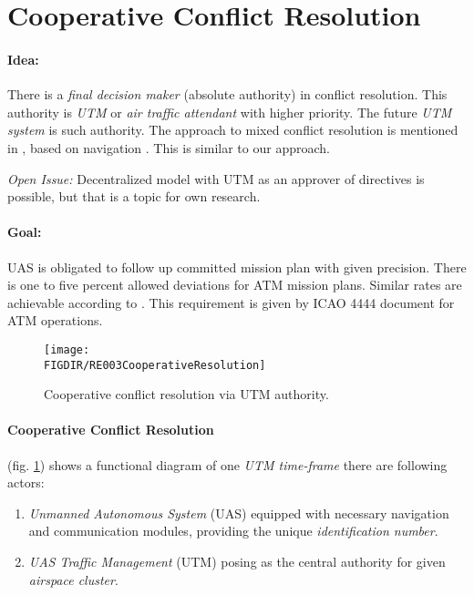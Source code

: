 \section{Cooperative Conflict Resolution}\label{sec:cooperativeConflictResolution}


\paragraph{Idea:} There is a \emph{final decision maker} (absolute authority) in conflict resolution. This authority is \emph{UTM} or \emph{air traffic attendant} with higher priority. The future \emph{UTM system} is such authority. The approach to mixed conflict resolution is mentioned in \cite{ramasamy2014towards}, based on navigation \cite{ramasamy2013novel}. This is similar to our approach. 

\begin{note}
    \emph{Open Issue:} Decentralized model with UTM as an approver of directives is possible, but that is a topic for own research.
\end{note}

\paragraph{Goal:} UAS is obligated to follow up committed mission plan with given precision.  There is one to five percent  allowed deviations for ATM mission plans.     Similar rates are achievable according to \cite{ramasamy2014towards}.  This requirement is given by \cite{icao4444} ICAO 4444 document for ATM operations.

\begin{figure}[H]
    \centering
    \texttt{[image: \\FIGDIR/RE003CooperativeResolution]} 
    \caption{Cooperative conflict resolution via UTM authority.}
    \label{fig:CooperativeConflictResolutionUTM}
\end{figure}

\paragraph{Cooperative Conflict Resolution} (fig. \ref{fig:CooperativeConflictResolutionUTM}) shows a functional diagram of one \emph{UTM time-frame} there  are following actors:
\begin{enumerate}
    \item \emph{Unmanned Autonomous System} (UAS) equipped with necessary navigation and communication modules, providing the unique \emph{identification number}.
    
    \item \emph{UAS Traffic Management} (UTM) posing as the central authority for given \emph{airspace cluster}.
\end{enumerate}

